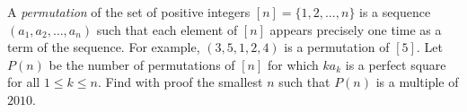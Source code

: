 A \emph{permutation} of the set of positive integers $[n] = \{1, 2, . . . , n\}$ is a sequence $(a_1 , a_2 , \ldots, a_n ) $ such that each element of $[n]$ appears precisely one time as a term of the sequence. For example, $(3, 5, 1, 2, 4)$ is a permutation of $[5]$. Let $P (n)$ be the number of permutations of $[n]$ for which $ka_k$ is a perfect square for all $1 \leq k \leq n$. Find with proof the smallest $n$ such that $P (n)$ is a multiple of $2010$.